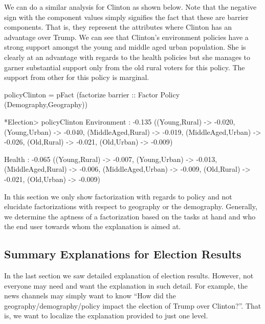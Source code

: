 \documentclass{jfp}
\begin{document}
We can do a similar analysis for Clinton as shown below. Note that the negative sign with the component values simply signifies the fact that these are barrier components. That is, they represent the attributes where Clinton has an advantage over Trump. We can see that Clinton's environment policies have a strong support amongst the young and middle aged urban population. She is clearly at an advantage with regards to the health policies but she manages to garner substantial support only from the old rural voters for this policy. The support from other for this policy is marginal. 
\begin{haskellcode}
policyClinton = pFact (factorize barrier :: Factor Policy (Demography,Geography))

*Election> policyClinton
Environment : -0.135 ({(Young,Rural) -> -0.020,
                       (Young,Urban) -> -0.040,
                       (MiddleAged,Rural) -> -0.019,
                       (MiddleAged,Urban) -> -0.026,
                       (Old,Rural) -> -0.021,
                       (Old,Urban) -> -0.009})

Health : -0.065 ({(Young,Rural) -> -0.007,
                  (Young,Urban) -> -0.013,
                  (MiddleAged,Rural) -> -0.006,
                  (MiddleAged,Urban) -> -0.009,
                  (Old,Rural) -> -0.021,
                  (Old,Urban) -> -0.009})
\end{haskellcode}

In this section we only show factorization with regards to policy and not elucidate factorizations with respect to geography or the demography. Generally, we determine the aptness of a factorization based on the tasks at hand and who the end user towards whom the explanation is aimed at. 

\subsection{Summary Explanations for Election Results}
In the last section we saw detailed explanation of election results. However, not everyone may need and want the explanation in such detail. For example, the news channels may simply want to know ``How did the geography/demography/policy impact the election of Trump over Clinton?''. That is, we want to localize the explanation provided to just one level.
\end{document}
